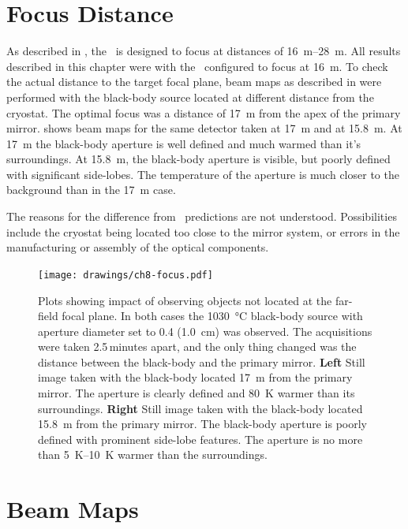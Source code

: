 \section{Focus Distance}\label{sec:ch8-focus-distance}

As described in , the \Imager\ is designed to focus at distances of \SIrange{16}{28}{\m}.
All results described in this chapter were with the \Imager\ configured to focus at 16~m.
To check the actual distance to the target focal plane, beam maps as described in  were performed with the black-body source located at different distance from the cryostat.
The optimal focus was a distance of \SI{17}{\m} from the apex of the primary mirror.
 shows beam maps for the same detector taken at \SI{17}{\m} and at \SI{15.8}{\m}.
At \SI{17}{\m} the black-body aperture is well defined and much warmed than it's surroundings.
At \SI{15.8}{\m}, the black-body aperture is visible, but poorly defined with significant side-lobes.
The temperature of the aperture is much closer to the background than in the \SI{17}{\m} case.

The reasons for the difference from \ZEMAX\ predictions are not understood.
Possibilities include the cryostat being located too close to the mirror system, or errors in the manufacturing or assembly of the optical components.

\begin{figure}
\centering
\texttt{[image: drawings/ch8-focus.pdf]}
\caption{
  Plots showing impact of observing objects not located at the far-field focal plane.
  In both cases the \SI{1030}{\celsius} black-body source with aperture diameter set to \SI{0.4}{\in} (\SI{1.0}{\cm}) was observed. The acquisitions were taken 2.5\,minutes apart, and the only thing changed was the distance between the black-body and the primary mirror.
  \textbf{Left} Still image taken with the black-body located \SI{17}{\m} from the primary mirror.
  The aperture is clearly defined and \SI{80}{\K} warmer than its surroundings.
  \textbf{Right} Still image taken with the black-body located \SI{15.8}{\m} from the primary mirror.
  The black-body aperture is poorly defined with prominent side-lobe features.
  The aperture is no more than \SIrange{5}{10}{\K} warmer than the surroundings.
}
\label{fig:ch8-focus}
\end{figure}

\section{Beam Maps} \label{sec:ch8-beam-maps}


